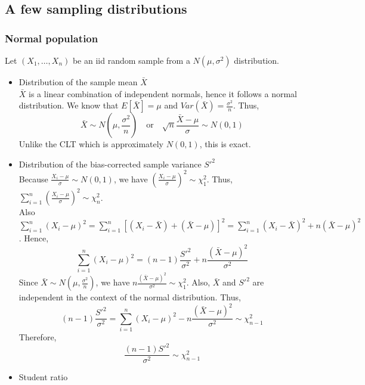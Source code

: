 \subsection{A few sampling distributions}

\subsubsection{Normal population}
Let $(X_1,\ldots,X_n)$ be an iid random sample from a $N(\mu,\sigma^2)$ distribution.
\begin{itemize}
    \item Distribution of the sample mean $\bar{X}$\\
    
        $\bar{X}$ is a linear combination of independent normals, hence it follows a normal distribution. We know that $E[\bar{X}] = \mu$ and $Var(\bar{X}) = \frac{\sigma^2}{n}$. Thus,
        \begin{equation*}
            \bar{X} \sim N\left(\mu, \frac{\sigma^2}{n}\right)\quad \text{or}\quad \sqrt{n}\frac{\bar{X}-\mu}{\sigma} \sim N(0,1)
        \end{equation*}
        Unlike the CLT which is approximately $N(0,1)$, this is exact.
    \item Distribution of the bias-corrected sample variance $S'^2$\\
    
        Because $\frac{X_i - \mu}{\sigma}\sim N(0,1)$, we have $\left(\frac{X_i-\mu}{\sigma}\right)^2\sim \chi^2_1$. 
        Thus, $\sum_{i=1}^{n}\left(\frac{X_i-\mu}{\sigma}\right)^2\sim \chi^2_n$.\\

        Also $\sum_{i=1}^{n}(X_i - \mu)^2 = \sum_{i=1}^{n}[(X_i - \bar{X}) + (\bar{X} - \mu)]^2 = \sum_{i=1}^{n}(X_i - \bar{X})^2 + n(\bar{X} - \mu)^2$.
        Hence, 
        \begin{equation*}
            \sum_{i=1}^{n}(X_i - \mu)^2 = (n-1)\frac{S'^2}{\sigma^2} + n\frac{(\bar{X} - \mu)^2}{\sigma^2}
        \end{equation*}
        Since $\bar{X}\sim N(\mu,\frac{\sigma^2}{n})$, we have $n\frac{(\bar{X} - \mu)^2}{\sigma^2}\sim \chi^2_1$.
        Also, $\bar{X}$ and $S'^2$ are independent in the context of the normal distribution.
        Thus, \begin{equation*}
            (n-1)\frac{S'^2}{\sigma^2} = \sum_{i=1}^{n}(X_i - \mu)^2 - n\frac{(\bar{X} - \mu)^2}{\sigma^2} \sim \chi^2_{n-1}
        \end{equation*}
        Therefore,
        \begin{equation*}
            \frac{(n-1)S'^2}{\sigma^2} \sim \chi^2_{n-1}
        \end{equation*}
    \item Student ratio\\
    

\end{itemize}
